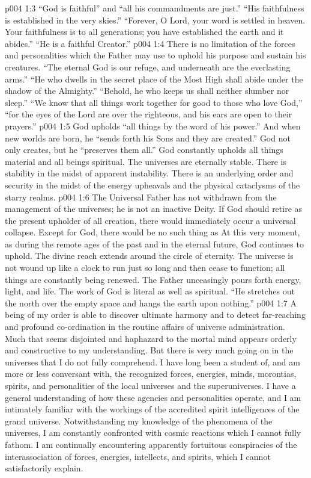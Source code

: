 \vs p004 1:3 “God is faithful” and “all his commandments are just.” “His faithfulness is established in the very skies.” “Forever, O Lord, your word is settled in heaven. Your faithfulness is to all generations; you have established the earth and it abides.” “He is a faithful Creator.”
\vs p004 1:4 There is no limitation of the forces and personalities which the Father may use to uphold his purpose and sustain his creatures. “The eternal God is our refuge, and underneath are the everlasting arms.” “He who dwells in the secret place of the Most High shall abide under the shadow of the Almighty.” “Behold, he who keeps us shall neither slumber nor sleep.” “We know that all things work together for good to those who love God,” “for the eyes of the Lord are over the righteous, and his ears are open to their prayers.”
\vs p004 1:5 God upholds “all things by the word of his power.” And when new worlds are born, he “sends forth his Sons and they are created.” God not only creates, but he “preserves them all.” God constantly upholds all things material and all beings spiritual. The universes are eternally stable. There is stability in the midst of apparent instability. There is an underlying order and security in the midst of the energy upheavals and the physical cataclysms of the starry realms.
\vs p004 1:6 The Universal Father has not withdrawn from the management of the universes; he is not an inactive Deity. If God should retire as the present upholder of all creation, there would immediately occur a universal collapse. Except for God, there would be no such thing as  At this very moment, as during the remote ages of the past and in the eternal future, God continues to uphold. The divine reach extends around the circle of eternity. The universe is not wound up like a clock to run just so long and then cease to function; all things are constantly being renewed. The Father unceasingly pours forth energy, light, and life. The work of God is literal as well as spiritual. “He stretches out the north over the empty space and hangs the earth upon nothing.”
\vs p004 1:7 \pc A being of my order is able to discover ultimate harmony and to detect far\hyp{}reaching and profound co\hyp{}ordination in the routine affairs of universe administration. Much that seems disjointed and haphazard to the mortal mind appears orderly and constructive to my understanding. But there is very much going on in the universes that I do not fully comprehend. I have long been a student of, and am more or less conversant with, the recognized forces, energies, minds, morontias, spirits, and personalities of the local universes and the superuniverses. I have a general understanding of how these agencies and personalities operate, and I am intimately familiar with the workings of the accredited spirit intelligences of the grand universe. Notwithstanding my knowledge of the phenomena of the universes, I am constantly confronted with cosmic reactions which I cannot fully fathom. I am continually encountering apparently fortuitous conspiracies of the interassociation of forces, energies, intellects, and spirits, which I cannot satisfactorily explain.
